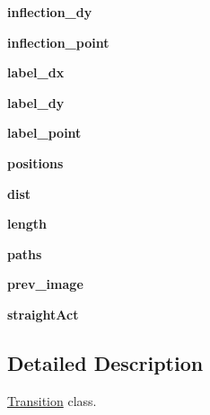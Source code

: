 \begin{DoxyCompactItemize}
{\bfseries inflection\+\_\+dy}
\item 
\mbox{\label{classTransition_1_1Transition_a099ba92395c09f2e5151b524e12fd240}} 
{\bfseries inflection\+\_\+point}
\item 
\mbox{\label{classTransition_1_1Transition_ab8df2fbcf9bbb5bbd6b5709a9f98eb4f}} 
{\bfseries label\+\_\+dx}
\item 
\mbox{\label{classTransition_1_1Transition_a0aa2d65721c19c39e7f6ea23f4f52732}} 
{\bfseries label\+\_\+dy}
\item 
\mbox{\label{classTransition_1_1Transition_a52578f5c3bffac60f486e2924917e4ba}} 
{\bfseries label\+\_\+point}
\item 
\mbox{\label{classTransition_1_1Transition_a706cc3bebe6e19a301226261254e2028}} 
{\bfseries positions}
\item 
\mbox{\label{classTransition_1_1Transition_acde1266dcb503cfa5c23817ca9bb8ac3}} 
{\bfseries dist}
\item 
\mbox{\label{classTransition_1_1Transition_aae730aeefff60996efebd8e22b9bfcd9}} 
{\bfseries length}
\item 
\mbox{\label{classTransition_1_1Transition_a66943740b218cea8d6c41d2744e60e31}} 
{\bfseries paths}
\item 
\mbox{\label{classTransition_1_1Transition_a86dbeec0c3d8e9d1c99cb3a0f5bc01da}} 
{\bfseries prev\+\_\+image}
\item 
\mbox{\label{classTransition_1_1Transition_a7b1759ea6c850f5d4afde75508a11d43}} 
{\bfseries straight\+Act}
\end{DoxyCompactItemize}


\subsection{Detailed Description}
\mbox{\hyperlink{classTransition_1_1Transition}{Transition}} class. 

